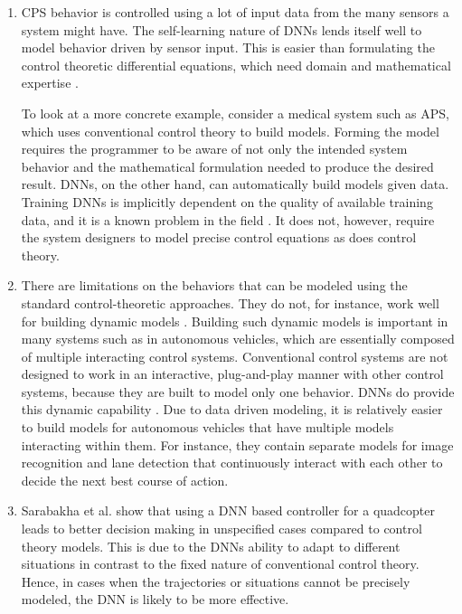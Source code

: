 \begin{enumerate}
	\item CPS behavior is controlled using a lot of input data from the many sensors a system might have. The self-learning nature of DNNs lends itself well to model behavior driven by sensor input. This is easier than formulating the control theoretic differential equations, which need domain and mathematical expertise \cite{Aamir_2013}.
	
	
	To look at a more concrete example, consider a medical system such as \ac{APS}, which uses conventional control theory to build models. 
	Forming the model requires the programmer to be aware of not only the intended system behavior and the mathematical formulation needed to produce the desired result. 
	DNNs, on the other hand, can automatically build models given data.
	Training DNNs is implicitly dependent on the quality of available training data, and it is a known problem in the field \cite{jabbar2015methods}. It does not, however, require the system designers to model precise control equations as does control theory.
	\item  There are limitations on the behaviors that can be modeled using the standard control-theoretic approaches. They do not, for instance, work well for building dynamic models \cite{article23}. Building such dynamic models is important in many systems such as in autonomous vehicles, which are essentially composed of multiple interacting control systems. Conventional control systems are not designed to work in an interactive, plug-and-play manner with other control systems, because they are built to model only one behavior. DNNs do provide this dynamic capability \cite{article23}. 
	Due to data driven modeling, it is relatively easier to build models for autonomous vehicles that have multiple models interacting within them.
	For instance, they contain separate models for image recognition and lane detection that continuously interact with each other to decide the next best course of action.
	
	\item Sarabakha et al. \cite{sarabakha2019online} show that using a \ac{DNN} based controller for a quadcopter leads to better decision making in unspecified cases compared to control theory models.
	This is due to the \ac{DNN}s ability to adapt to different situations in contrast to the fixed nature of conventional control theory. 
	Hence, in cases when the trajectories or situations cannot be precisely modeled, the \ac{DNN} is likely to be more effective. 
\end{enumerate}




